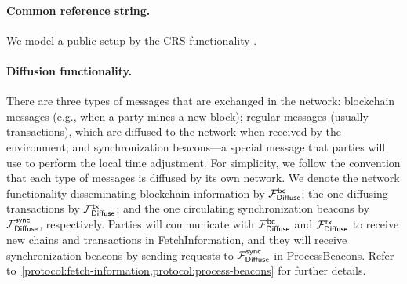 

\paragraph{Common reference string.}
%
We model a public setup by the CRS functionality \funcCRS.



\paragraph{Diffusion functionality.}
%
There are three types of messages that are exchanged in the network: blockchain messages (e.g., when a party mines a new block); regular messages (usually transactions), which are diffused to the network when received by the environment; and synchronization beacons---a special message that parties will use to perform the local time adjustment.
%
For simplicity, we follow the convention that each type of messages is diffused by its own network.
%
We denote the network functionality disseminating blockchain information by $\mathcal{F}_{\mathsf{Diffuse}}^{\mathsf{bc}}$; the one diffusing transactions by $\mathcal{F}_{\mathsf{Diffuse}}^{\mathsf{tx}}$; and the one circulating synchronization beacons by $\mathcal{F}_{\mathsf{Diffuse}}^{\mathsf{sync}}$, respectively.
%
Parties will communicate with $\mathcal{F}_{\mathsf{Diffuse}}^{\mathsf{bc}}$ and $\mathcal{F}_{\mathsf{Diffuse}}^{\mathsf{tx}}$ to receive new chains and transactions in \textsf{FetchInformation}, and they will receive synchronization beacons by sending requests to $\mathcal{F}_{\mathsf{Diffuse}}^{\mathsf{sync}}$ in \textsf{ProcessBeacons}.
%
Refer to~\cref{protocol:fetch-information,protocol:process-beacons} for further details.


